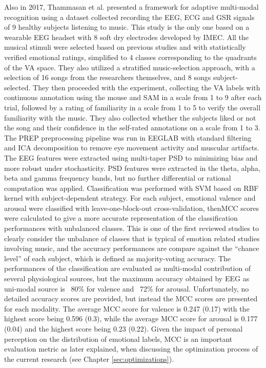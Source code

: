 Also in 2017, Thammasan et al. \cite{thammasan_multimodal_2017} presented a framework for adaptive multi-modal recognition using a dataset collected recording the \ac{EEG}, \ac{ECG} and \ac{GSR} signals of 9 healthy subjects listening to music. This study is the only one based on a wearable \ac{EEG} headset with 8 soft dry electrodes developed by IMEC. All the musical stimuli were selected based on previous studies and with statistically verified emotional ratings, simplified to 4 classes corresponding to the quadrants of the \ac{VA} space. They also utilized a stratified music-selection approach, with a selection of 16 songs from the researchers themselves, and 8 songs subject-selected. They then proceeded with the experiment, collecting the \ac{VA} labels with continuous annotation using the mouse and SAM \cite{bradley_measuring_1994} in a scale from 1 to 9 after each trial, followed by a rating of familiarity in a scale from 1 to 5 to verify the overall familiarity with the music. They also collected whether the subjects liked or not the song and their confidence in the self-rated annotations on a scale from 1 to 3. The PREP \cite{bigdely-shamlo_prep_2015} preprocessing pipeline was run in EEGLAB with standard filtering and \ac{ICA} decomposition to remove eye movement activity and muscular artifacts. The \ac{EEG} features were extracted using multi-taper \ac{PSD} to minimizing bias and more robust under stochasticity. \ac{PSD} features were extracted in the theta, alpha, beta and gamma frequency bands, but no further differential or rational computation was applied. Classification was performed with \ac{SVM} based on RBF kernel with subject-dependent strategy. For each subject, emotional valence and arousal were classified with leave-one-block-out cross-validation, then\ac{MCC} scores were calculated to give a more accurate representation of the classification performances with unbalanced classes. This is one of the first reviewed studies to clearly consider the unbalance of classes that is typical of emotion related studies involving music, and the accuracy performances are compare against the “chance level” of each subject, which is defined as majority-voting accuracy. The performances of the classification are evaluated as multi-modal contribution of several physiological sources, but the maximum accuracy obtained by \ac{EEG} as uni-modal source is ~80\% for valence and ~72\% for arousal. Unfortunately, no detailed accuracy scores are provided, but instead the \ac{MCC} scores are presented for each modality. The average \ac{MCC} score for valence is 0.247 (0.17) with the highest score being 0.596 (0.3), while the average \ac{MCC} score for arousal is 0.177 (0.04) and the highest score being 0.23 (0.22). Given the impact of personal perception on the distribution of emotional labels, \ac{MCC} is an important evaluation metric as later explained, when discussing the optimization process of the current research (see Chapter \ref{sec:optimizations}).
